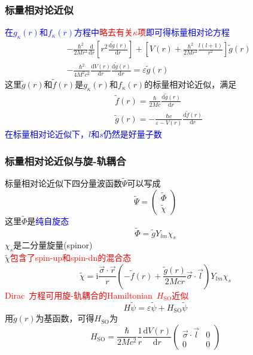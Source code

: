 \frame
{
	\frametitle{标量相对论近似}
	\textcolor{blue}{在$g_{\kappa}(r)$和$f_{\kappa}(r)$方程中}\textcolor{red}{略去有关$\kappa$项}\textcolor{blue}{即可得标量相对论方程}
	\begin{displaymath}
		\begin{aligned}
			&-\frac{\hbar^2}{2Mr^2}\frac{\mathrm{d}}{\mathrm{d}r}\left[ r^2\frac{\mathrm{d}\tilde{g}(r)}{\mathrm{d}r} \right]+\left[ V(r)+\frac{\hbar^2}{2Mr^2}\frac{l(l+1)}{r^2} \right]\tilde{g}(r)\\
			&-\frac{\hbar^2}{4M^2c^2}\frac{\mathrm{d}V(r)}{\mathrm{d}r}\frac{\mathrm{d}\tilde{g}(r)}{\mathrm{d}r}=\varepsilon\tilde{g}(r)
		\end{aligned}
	\end{displaymath}
	这里$\tilde g(r)$和$\tilde f(r)$是$g_{\kappa}(r)$和$f_{\kappa}(r)$的标量相对论近似，满足
	\begin{displaymath}
		\begin{aligned}
			&\tilde{f}(r)=\frac{\hbar}{2Mc}\frac{\mathrm{d}\tilde{g}(r)}{\mathrm{d}r}\\
			&\tilde{g}(r)=-\frac{\hbar c}{\varepsilon-V(r)}\frac{\mathrm{d}\tilde{f}(r)}{\mathrm{d}r}
		\end{aligned}
	\end{displaymath}
	\textcolor{blue}{在标量相对论近似下，$l$和$s$仍然是好量子数}
}

\frame
{
	\frametitle{标量相对论近似与旋-轨耦合}
	标量相对论近似下四分量波函数$\tilde\Psi$可以写成
	\begin{displaymath}
		\tilde\Psi=\left( 
		\begin{matrix}
			\tilde\Phi\\
			\tilde\chi
		\end{matrix}
		\right)
	\end{displaymath}
	这里$\tilde\Phi$是\textcolor{blue}{纯自旋态}$$\tilde\Phi=\tilde gY_{lm}\chi_s$$
	$\chi_s$是二分量旋量(\textrm{spinor})\\
	$\tilde\chi$\textcolor{red}{包含了\textrm{spin-up}和\textrm{spin-dn}的混合态}
	\begin{displaymath}
		\tilde\chi=\mathrm{i}\frac{\vec{\sigma}\cdot\vec r}r\left( -\tilde{f}(r)+\frac{\tilde{g}(r)}{2Mcr}\vec{\sigma}\cdot\vec l \right)Y_{lm}\chi_s
	\end{displaymath}
	\textcolor{red}{\textrm{Dirac~}方程可用旋-轨耦合的\textrm{Hamiltonian~}$H_{\mathrm{SO}}$近似}
	$$H\tilde{\psi}=\varepsilon\tilde{\psi}+H_{\mathrm{SO}}\tilde{\psi}$$
	用$\tilde{g}(r)$为基函数，可得$H_{\mathrm{SO}}$为
	\begin{displaymath}
		H_{\mathrm{SO}}=\frac{\hbar}{2Mc^2}\frac1r\frac{\mathrm{d}V(r)}{\mathrm{d}r}\left( 
		\begin{matrix}
			\vec{\sigma}\cdot\vec l &0\\
			0 &0
		\end{matrix}
		\right)
	\end{displaymath}
}

